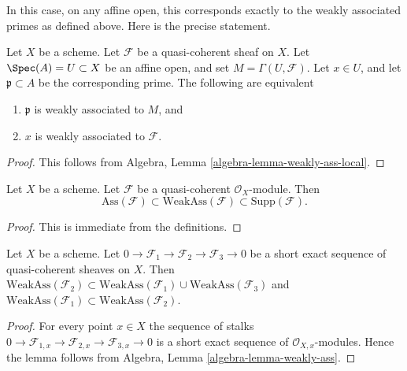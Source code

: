 \noindent
In this case, on any affine open, this corresponds exactly to the
weakly associated primes as defined above. Here is the precise statement.

\begin{lemma}
\label{lemma-weakly-associated-affine-open}
Let $X$ be a scheme. Let $\mathcal{F}$ be a quasi-coherent sheaf on $X$.
Let $\Spec(A) = U \subset X$ be an affine open, and set
$M = \Gamma(U, \mathcal{F})$.
Let $x \in U$, and let $\mathfrak p \subset A$ be the corresponding prime.
The following are equivalent
\begin{enumerate}
\item $\mathfrak p$ is weakly associated to $M$, and
\item $x$ is weakly associated to $\mathcal{F}$.
\end{enumerate}
\end{lemma}

\begin{proof}
This follows from
Algebra, Lemma \ref{algebra-lemma-weakly-ass-local}.
\end{proof}

\begin{lemma}
\label{lemma-weakly-ass-support}
Let $X$ be a scheme.
Let $\mathcal{F}$ be a quasi-coherent $\mathcal{O}_X$-module.
Then
$$
\text{Ass}(\mathcal{F}) \subset \text{WeakAss}(\mathcal{F}) \subset
\text{Supp}(\mathcal{F}).
$$
\end{lemma}

\begin{proof}
This is immediate from the definitions.
\end{proof}

\begin{lemma}
\label{lemma-ses-weakly-ass}
Let $X$ be a scheme.
Let $0 \to \mathcal{F}_1 \to \mathcal{F}_2 \to \mathcal{F}_3 \to 0$
be a short exact sequence of quasi-coherent sheaves on $X$.
Then
$\text{WeakAss}(\mathcal{F}_2) \subset
\text{WeakAss}(\mathcal{F}_1) \cup \text{WeakAss}(\mathcal{F}_3)$
and
$\text{WeakAss}(\mathcal{F}_1) \subset \text{WeakAss}(\mathcal{F}_2)$.\
\end{lemma}

\begin{proof}
For every point $x \in X$ the sequence of stalks
$0 \to \mathcal{F}_{1, x} \to \mathcal{F}_{2, x} \to \mathcal{F}_{3, x} \to 0$
is a short exact sequence of $\mathcal{O}_{X, x}$-modules.
Hence the lemma follows from
Algebra, Lemma \ref{algebra-lemma-weakly-ass}.
\end{proof}

